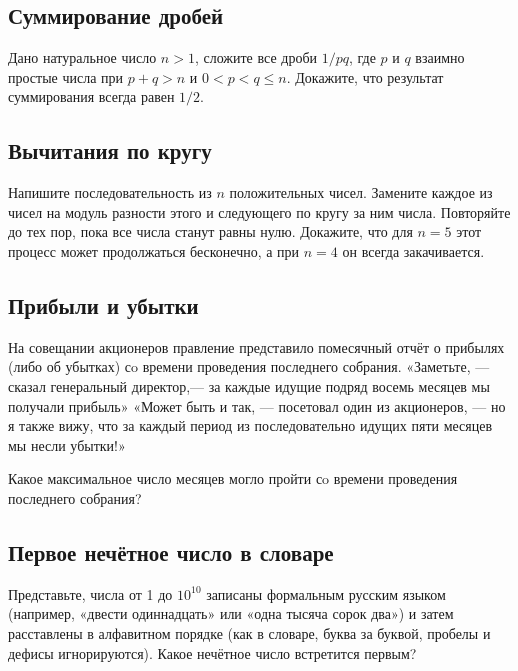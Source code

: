 \subsection*{Суммирование дробей}%

Дано натуральное число $n>1$, 
сложите все дроби $1/pq$, где $p$ и $q$ взаимно простые числа при $p+q>n$ и $0<p<q\le n$.
Докажите, что результат суммирования всегда равен $1/2$.

\subsection*{Вычитания по кругу}

Напишите последовательность из $n$ положительных чисел.
Замените каждое из чисел на модуль разности %
этого и следующего по кругу за ним числа.
Повторяйте до тех пор, пока все числа станут равны нулю.
Докажите, что для $n=5$ этот процесс может продолжаться бесконечно, 
а при $n=4$ он всегда закачивается.

\subsection*{Прибыли и убытки}%

На совещании акционеров правление представило помесячный отчёт о прибылях (либо об убытках) сo времени проведения последнего собрания.
«Заметьте, --- сказал генеральный директор,--- за каждые идущие подряд восемь месяцев мы получали прибыль»
«Может быть и так, --- посетовал один из акционеров, --- но я также вижу, что за каждый период из последовательно идущих пяти месяцев мы несли убытки!»

Какое максимальное число месяцев могло пройти сo времени проведения последнего собрания?

\subsection*{Первое нечётное число в словаре}%

Представьте, числа от 1 до $10^{10}$ записаны формальным русским языком (например, «двести одиннадцать» или «одна тысяча сорок два») и затем расставлены в алфавитном порядке (как в словаре, буква за буквой, пробелы и дефисы игнорируются).
Какое нечётное число встретится первым?
